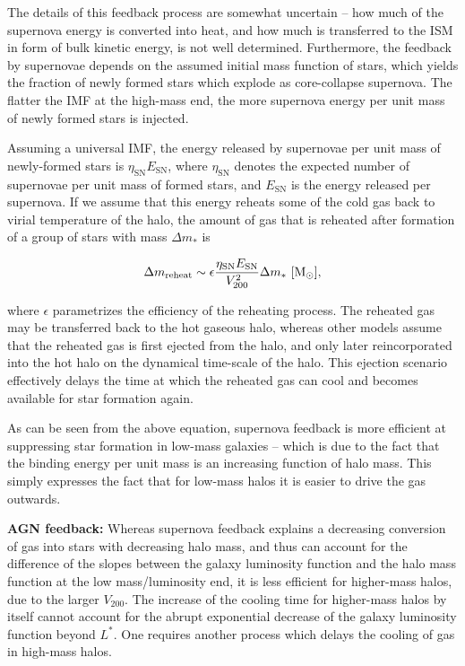 \documentclass[a4paper,11pt]{article}
\begin{document}
{\noindent}The details of this feedback process are somewhat uncertain -- how much of the supernova energy is converted into heat, and how much is transferred to the ISM in form of bulk kinetic energy, is not well determined. Furthermore, the feedback by supernovae depends on the assumed initial mass function of stars, which yields the fraction of newly formed stars which explode as core-collapse supernova. The flatter the IMF at the high-mass end, the more supernova energy per unit mass of newly formed stars is injected.

{\noindent}Assuming a universal IMF, the energy released by supernovae per unit mass of newly-formed stars is $\eta_\mathrm{SN}E_\mathrm{SN}$, where $\eta_\mathrm{SN}$ denotes the expected number of supernovae per unit mass of formed stars, and $E_\mathrm{SN}$ is the energy released per supernova. If we assume that this energy reheats some of the cold gas back to virial temperature of the halo, the amount of gas that is reheated after formation of a group of stars with mass $\Delta m_*$ is

\begin{align*}
    \Delta m_\mathrm{reheat} \sim \epsilon\frac{\eta_\mathrm{SN}E_\mathrm{SN}}{V_{200}^2}\Delta m_* ~ [{\rm M_\odot}],
\end{align*}

{\noindent}where $\epsilon$ parametrizes the efficiency of the reheating process. The reheated gas may be transferred back to the hot gaseous halo, whereas other models assume that the reheated gas is first ejected from the halo, and only later reincorporated into the hot halo on the dynamical time-scale of the halo. This ejection scenario effectively delays the time at which the reheated gas can cool and becomes available for star formation again.

{\noindent}As can be seen from the above equation, supernova feedback is more efficient at suppressing star formation in low-mass galaxies -- which is due to the fact that the binding energy per unit mass is an increasing function of halo mass. This simply expresses the fact that for low-mass halos it is easier to drive the gas outwards.

{\noindent}\textbf{AGN feedback:} Whereas supernova feedback explains a decreasing conversion of gas into stars with decreasing halo mass, and thus can account for the difference of the slopes between the galaxy luminosity function and the halo mass function at the low mass/luminosity end, it is less efficient for higher-mass halos, due to the larger $V_{200}$. The increase of the cooling time for higher-mass halos by itself cannot account for the abrupt exponential decrease of the galaxy luminosity function beyond $L^*$. One requires another process which delays the cooling of gas in high-mass halos.
\end{document}
